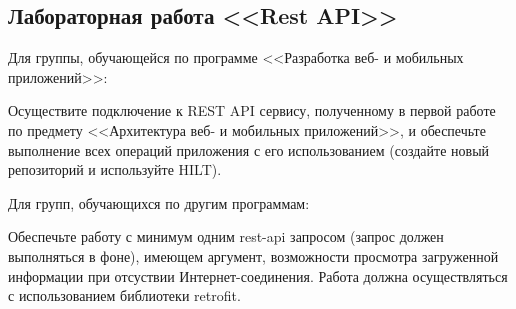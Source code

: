 \subsection{Лабораторная работа <<Rest API>> }

Для группы, обучающейся по программе <<Разработка веб- и мобильных приложений>>:

Осуществите подключение к REST API сервису, полученному в первой работе по предмету
<<Архитектура веб- и мобильных приложений>>, и обеспечьте выполнение всех операций 
приложения с его использованием (создайте новый репозиторий и используйте HILT).

Для групп, обучающихся по другим программам:


Обеспечьте работу с минимум одним rest-api запросом (запрос должен выполняться в фоне), имеющем аргумент, 
возможности просмотра загруженной информации при отсуствии Интернет-соединения. Работа должна осуществляться
с использованием библиотеки retrofit. 

